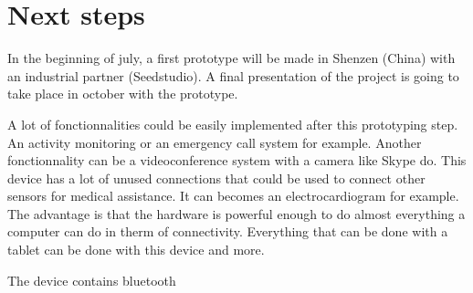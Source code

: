\section{Next steps}
\label{chap: next steps}

In the beginning of july, a first prototype will be made in Shenzen (China) with an industrial partner (Seedstudio). A final presentation of the project is going to take place in october with the prototype.

A lot of fonctionnalities could be easily implemented after this prototyping step. An activity monitoring or an emergency call system for example. Another fonctionnality can be a videoconference system with a camera like Skype do. This device has a lot of unused connections that could be used to connect other sensors for medical assistance. It can becomes an electrocardiogram for example. The advantage is that the hardware is powerful enough to do almost everything a computer can do in therm of connectivity. Everything that can be done with a tablet can be done with this device and more.

The device contains bluetooth
